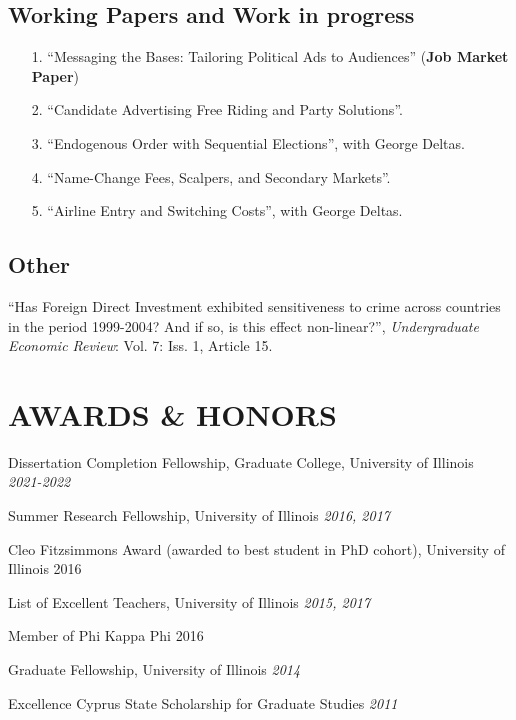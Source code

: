 \documentclass{article}
\begin{document}
\subsection{Working Papers and Work in progress}
\begin{itemize}
    \item[1.] ``Messaging the Bases: Tailoring Political Ads to Audiences'' ({\bf Job Market Paper})
    \item[2.] ``Candidate Advertising Free Riding and Party Solutions''.
    \item[3.] ``Endogenous Order with Sequential Elections'', with George Deltas.
    \item[4.] ``Name-Change Fees, Scalpers, and Secondary Markets''.
    \item[5.] ``Airline Entry and Switching Costs'', with George Deltas.
    \end{itemize}


\subsection{Other}
``Has Foreign Direct Investment exhibited sensitiveness to crime across countries in the period 1999-2004? And if so, is this effect non-linear?'', \emph{Undergraduate Economic Review}: Vol. 7: Iss. 1, Article 15. %


\section{AWARDS \& HONORS}

Dissertation Completion Fellowship, Graduate College, University of Illinois \hfill \emph{2021-2022}

Summer Research Fellowship, University of Illinois \hfill \emph{2016, 2017}

Cleo Fitzsimmons Award (awarded to best student in PhD cohort), University of Illinois \hfill 2016

List of Excellent Teachers, University of Illinois \hfill \emph{2015, 2017}

Member of Phi Kappa Phi \hfill {2016}

Graduate Fellowship, University of Illinois \hfill \emph{2014}

Excellence Cyprus State Scholarship for Graduate Studies \hfill \emph{2011}

\end{document}
